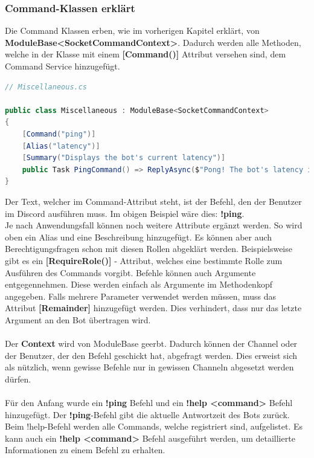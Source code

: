 \documentclass[a4paper, table]{article}
\begin{document}
\subsubsection*{Command-Klassen erklärt}
Die Command Klassen erben, wie im vorherigen Kapitel erklärt, von\\ \textbf{ModuleBase<SocketCommandContext>}. 
Dadurch werden alle Methoden, welche in der Klasse mit einem \textbf{[Command()]} Attribut versehen sind, dem Command Service hinzugefügt.

\begin{lstlisting}[language=csharp]
// Miscellaneous.cs

public class Miscellaneous : ModuleBase<SocketCommandContext>
{
    [Command("ping")]
    [Alias("latency")]
    [Summary("Displays the bot's current latency")]
    public Task PingCommand() => ReplyAsync($"Pong! The bot's latency is {Context.Client.Latency} ms.");
}
\end{lstlisting}
Der Text, welcher im Command-Attribut steht, ist der Befehl, den der Benutzer im Discord ausführen muss. 
Im obigen Beispiel wäre dies: \textbf{!ping}.\\
Je nach Anwendungsfall können noch weitere Attribute ergänzt werden. 
So wird oben ein Alias und eine Beschreibung hinzugefügt. 
Es können aber auch Berechtigungsfragen schon mit diesen Rollen abgeklärt werden. 
Beispielsweise gibt es ein \textbf{[RequireRole()]} - Attribut, welches eine bestimmte Rolle zum Ausführen des Commands vorgibt. 
Befehle können auch Argumente entgegennehmen. 
Diese werden einfach als Argumente im Methodenkopf angegeben. 
Falls mehrere Parameter verwendet werden müssen, muss das Attribut \textbf{[Remainder]} hinzugefügt werden. 
Dies verhindert, dass nur das letzte Argument an den Bot übertragen wird.\\\\
Der \textbf{Context} wird von ModuleBase geerbt. 
Dadurch können der Channel oder der Benutzer, der den Befehl geschickt hat, abgefragt werden. 
Dies erweist sich als nützlich, wenn gewisse Befehle nur in gewissen Channeln abgesetzt werden dürfen.\\\\
Für den Anfang wurde ein \textbf{!ping} Befehl und ein \textbf{!help <command>} Befehl hinzugefügt. 
Der \textbf{!ping}-Befehl gibt die aktuelle Antwortzeit des Bots zurück. 
Beim !help-Befehl werden alle Commands, welche registriert sind, aufgelistet. 
Es kann auch ein \textbf{!help <command>} Befehl ausgeführt werden, um detaillierte Informationen zu einem Befehl zu erhalten.
\end{document}

